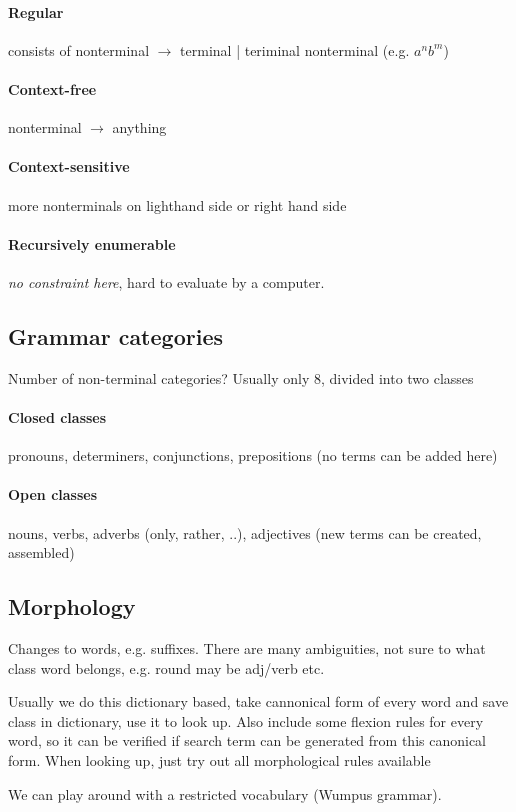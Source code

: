 \documentclass[11pt]{article}
\begin{document}
\paragraph{Regular} consists of nonterminal $\rightarrow$ terminal | teriminal nonterminal (e.g. $a^nb^m$)
\paragraph{Context-free} nonterminal $\rightarrow$ anything
\paragraph{Context-sensitive} more nonterminals on lighthand side or right hand side
\paragraph{Recursively enumerable} \emph{no constraint here}, hard to evaluate by a computer.

\subsection{Grammar categories}
Number of non-terminal categories? Usually only 8, divided into two classes
\paragraph{Closed classes} pronouns, determiners, conjunctions, prepositions (no terms can
be added here)
\paragraph{Open classes} nouns, verbs, adverbs (only, rather, ..), adjectives (new terms
can be created, assembled)

\subsection{Morphology}
Changes to words, e.g. suffixes. There are many ambiguities, not sure to what class
word belongs, e.g. round may be adj/verb etc.

Usually we do this dictionary based, take cannonical form of every word and save class in
dictionary, use it to look up. Also include some flexion rules for every word, so it can
be verified if search term can be generated from this canonical form. When looking up, just
try out all morphological rules available

We can play around with a restricted vocabulary (Wumpus grammar). 
\end{document}
